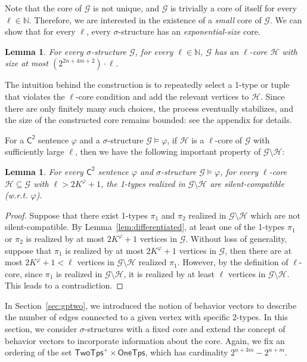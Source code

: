 \documentclass[10pt,a4paper]{article}
\newtheorem{lemma}[theorem]{Lemma}
\theoremstyle{definition}
\theoremstyle{remark}
\newcommand{\cG}{\mathcal{G}}
\newcommand{\cH}{\mathcal{H}}
\newcommand{\bbN}{\mathbb{N}}
\newcommand{\vocab}{\sigma}
\newcommand{\Ctwo}    {\mathsf{C^2}}
\newcommand{\twotypes}{\mathsf{TwoTps}}
\newcommand{\Onetypes}{\mathsf{OneTps}}
\begin{document}
Note that the core of $\cG$ is not unique,
and $\cG$ is trivially a core of itself for every $\ell \in \bbN$.
Therefore, we are interested in the existence of a \emph{small} core of $\cG$.
We can show that for every $\ell$, every $\vocab$-structure has an \emph{exponential-size} core.

\begin{lemma}\label{lem:small_core}
    For every $\vocab$-structure $\cG$, for every $\ell \in \bbN$,
    $\cG$ has an $\ell$-core $\cH$ with size at most $(2^{2n+4m+2}) \cdot \ell$.
\end{lemma}

The intuition behind the construction is to repeatedly select a 1-type or tuple that violates the $\ell$-core condition
and add the relevant vertices to $\cH$.
Since there are only finitely many such choices, the process eventually stabilizes,
and the size of the constructed core remains bounded: see the appendix for details.
 
For a $\Ctwo$ sentence $\varphi$ and a $\vocab$-structure $\cG \models \varphi$,
if $\cH$ is a $\ell$-core of $\cG$ with sufficiently large $\ell$,
then we have the following important property of $\cG \setminus \cH$:

\begin{lemma}\label{lem:mutually_null_compatible}
    For every $\Ctwo$ sentence $\varphi$ and $\vocab$-structure $\cG \models \varphi$,
    for every $\ell$-core $\cH \subseteq \cG$ with $\ell > 2K^\varphi + 1$, 
    the 1-types realized in $\cG \setminus \cH$ are silent-compatible (w.r.t. $\varphi$).
\end{lemma}

\begin{proof}
    Suppose that there exist 1-types $\pi_1$ and $\pi_2$ realized in $\cG \setminus \cH$
    which are not  silent-compatible.
    By Lemma~\ref{lem:differentiated},
    at least one of the 1-types $\pi_1$ or $\pi_2$ is realized by at most $2K^\varphi+1$ vertices in $\cG$.
    Without loss of generality,
    suppose that $\pi_1$ is realized by at most $2K^\varphi+1$ vertices in $\cG$,
    then there are at most $2K^\varphi+1 < \ell$ vertices in $\cG \setminus \cH$ realized $\pi_1$.
    However, by the definition of $\ell$-core, since $\pi_1$ is realized in $\cG \setminus \cH$,
    it is realized by at least $\ell$ vertices in $\cG \setminus \cH$.
    This leads to a contradiction.
\end{proof}

In Section~\ref{sec:gptwo}, we introduced the notion of behavior vectors to describe the number of edges connected to a given vertex with specific 2-types.
In this section, we consider $\vocab$-structures with a fixed core and extend the concept of behavior vectors to incorporate information about the core.
Again, we fix an ordering of the set $\twotypes^+ \times \Onetypes$,
which has cardinality $2^{n+3m}-2^{n+m}$.
\end{document}
